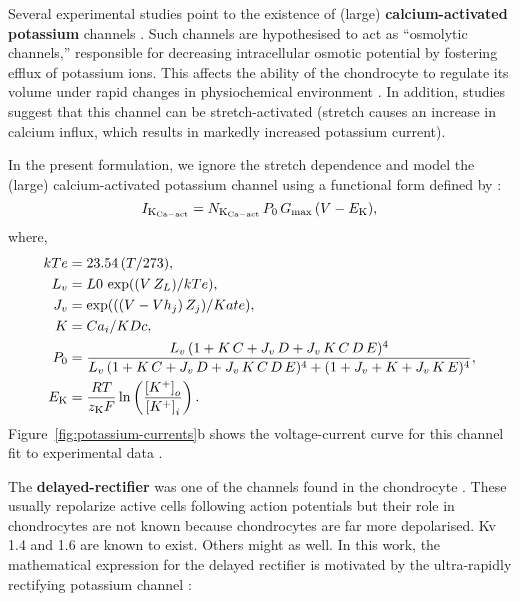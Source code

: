Several experimental studies point to the existence of (large) {\bf
  calcium-activated potassium} channels
\citep{BarrettJolleyetal2010}. Such channels are hypothesised to act
as ``osmolytic channels,'' responsible for decreasing intracellular
osmotic potential by fostering efflux of potassium ions. This affects
the ability of the chondrocyte to regulate its volume under rapid
changes in physiochemical environment \citep{Lewisetal2011}. In
addition, studies suggest \citep{UNKNOWN} that this channel can be
stretch-activated (stretch causes an increase in calcium influx, which
results in markedly increased potassium current).

In the present formulation, we ignore the stretch dependence and model
the (large) calcium-activated potassium channel using a functional
form defined by \citet{HorriganAldrich2002}:
\begin{equation}
    I_{\rm K_{Ca-act}} = N_{\rm K_{Ca-act}}\, P_0\, G_{\rm max}\, (V -
    E_{\rm K}),
    \label{I_K_Ca_act}
\end{equation}
where,
\begin{equation*}
  \begin{split}
    kTe & = 23.54\, (T/273),\\
    L_v & = L0\, \exp((V\, Z_L)/kTe),\\
    J_v & = \exp(((V - Vh_j)\, Z_j)/Kate),\\
    K & = Ca_i/KDc,\\
    P_0 & = \frac{L_v\, (1+K\, C+J_v\, D+J_v\, K\, C\, D\, E)^4}
    {L_v\, (1+K\, C+J_v\, D+J_v\, K\, C\, D\, E)^4 +
      (1+J_v+K+J_v\, K\, E)^4},\\
    E_{\rm K} & =  \frac{R T}{z_{\rm K} F}
    \ln\left(\frac{\left[K^{+}\right]_{o}}
      {\left[K^{+}\right]_{i}}\right).
  \end{split}
\end{equation*}
Figure~\ref{fig:potassium-currents}b shows the voltage-current
curve for this channel fit to experimental data
\citep{Clarketal2011}.

The {\bf delayed-rectifier} was one of the channels found in the
chondrocyte \citep{Walshetal1992, Sugimotoetal1996,
  Mobasherietal2005}. These usually repolarize active cells following
action potentials but their role in chondrocytes are not known because
chondrocytes are far more depolarised. Kv 1.4 and 1.6
\citep{Clarketal2010, Mobasherietal2005} are known to exist. Others
might as well. In this work, the mathematical expression for the
delayed rectifier is motivated by the ultra-rapidly rectifying
potassium channel \citep{Maleckaretal2009}:

